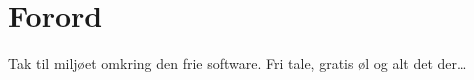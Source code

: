 \chapter{Forord}


Tak til miljøet omkring den frie software. Fri tale, gratis øl og alt
det der\dots


